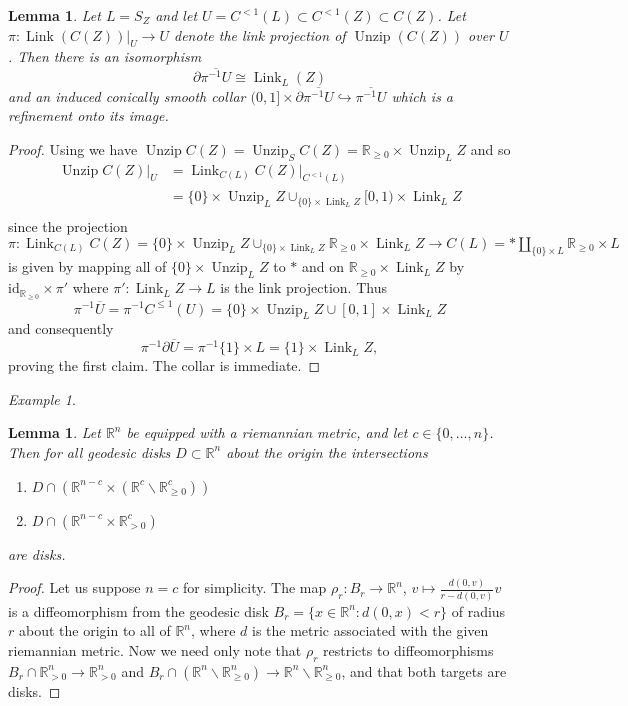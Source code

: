 \documentclass[11pt]{amsart}
\newcommand{\mbb}[1]{\mathbb{#1}}
\newcommand{\R}{\mbb{R}}
\newcommand{\id}{\mathrm{id}}
\DeclareMathOperator{\Unzip}{Unzip}
\DeclareMathOperator{\Link}{Link}
\numberwithin{equation}{section}
\theoremstyle{definition}
\theoremstyle{remark}
\newtheorem{example}[equation]{Example}
\theoremstyle{plain}
\newtheorem{lemma}[equation]{Lemma}
\begin{document}
\begin{lemma}\label{V6RIX5L}
    Let $L=S_Z$ and let $U=C^{<1}(L)\subset C^{<1}(Z)\subset C(Z)$. Let $\pi\colon \Link(C(Z))|_{U}\to U$ denote the link projection of $\Unzip (C(Z))$ over $U$. Then there is an isomorphism
    \[
        \partial\overline{\pi^{-1}U}\cong \Link_L(Z)
    \]
    and an induced conically smooth collar 
    \(
        (0,1]\times\partial\overline{\pi^{-1}U}\hookrightarrow \overline{\pi^{-1}U}
    \)
    which is a refinement onto its image.
\end{lemma}
\begin{proof}
    Using  we have $\Unzip C(Z)=\Unzip_{S}C(Z)=\R_{\geq0}\times\Unzip_L Z$ and so 
    \begin{align*}
        \Unzip C(Z)|_{U}&=\Link_{C(L)}C(Z)|_{C^{<1}(L)}\\
        &=\{0\}\times \Unzip_L Z\cup_{\{0\}\times\Link_LZ}[0,1)\times\Link_L Z\\
    \end{align*}
    since the projection $\pi\colon\Link_{C(L)}C(Z)=\{0\}\times\Unzip_L Z\cup_{\{0\}\times\Link_LZ}\R_{\geq0}\times \Link_L Z\to C(L)=\ast\amalg_{\{0\}\times L}\R_{\geq0}\times L$ is given by mapping all of $\{0\}\times\Unzip_L Z$ to $\ast$ and on $\R_{\geq0}\times \Link_LZ$ by $\id_{\R_{\geq0}}\times\pi'$ where $\pi'\colon \Link_LZ\to L$ is the link projection.
    Thus 
    \[
        \pi^{-1}\overline{U}=\pi^{-1}C^{\leq 1}(U)=\{0\}\times\Unzip_LZ\cup[0,1]\times\Link_LZ 
    \]
    and consequently 
    \begin{equation}\label{QX54WZB}
        \pi^{-1}\partial\overline{U}=\pi^{-1}\{1\}\times L=\{1\}\times\Link_L Z,
    \end{equation}
    proving the first claim. The collar is immediate.
\end{proof}

\begin{example}
    
\end{example}

\begin{lemma}\label{FBLD2TE}
    Let $\R^n$ be equipped with a riemannian metric, and let $c\in\{0,\dots,n\}$. Then for all geodesic disks $D\subset\R^n$ about the origin the intersections
    \begin{enumerate}
        \item $D\cap (\R^{n-c}\times(\R^{c}\smallsetminus\R^{c}_{\geq0}))$
        \item $D \cap (\R^{n-c}\times\R^{c}_{>0})$
    \end{enumerate}
    are disks.
\end{lemma}
\begin{proof}
    Let us suppose $n=c$ for simplicity. The map $\rho_r\colon B_r\to\R^n$, $v\mapsto \frac{d(0,v)}{r-d(0,v)}v$ is a diffeomorphism from the geodesic disk $B_r=\{x\in\R^n : d(0,x)<r\}$ of radius $r$ about the origin to all of $\R^n$, where $d$ is the metric associated with the given riemannian metric. Now we need only note that $\rho_r$ restricts to diffeomorphisms $B_r\cap\R^n_{>0}\to\R^n_{>0}$ and $B_r\cap(\R^n\smallsetminus\R^n_{\geq0})\to\R^n\smallsetminus\R^n_{\geq0}$, and that both targets are disks.
\end{proof}
\end{document}
